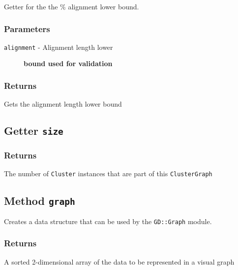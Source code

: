 Getter for the the \% alignment lower bound.

\subsubsection*{Parameters\label{Parameters}}
\begin{description}

\item[{\texttt{alignment} - Alignment length lower}] \textbf{bound used for validation}\end{description}
\subsubsection*{Returns\label{Returns}}


Gets the alignment length lower bound

\subsection*{Getter \texttt{size}\label{Getter_size}}
\subsubsection*{Returns\label{Returns}}


The number of \texttt{Cluster} instances that are part of this \texttt{ClusterGraph}

\subsection*{Method \texttt{graph}\label{Method_graph}}


Creates a data structure that can be used by the \texttt{GD::Graph} module.

\subsubsection*{Returns\label{Returns}}


A sorted 2-dimensional array of the data to be represented in a visual graph
